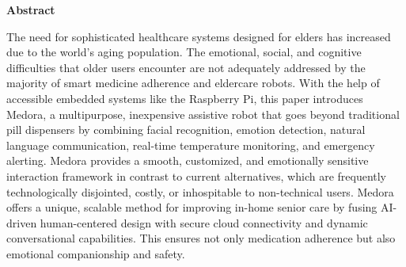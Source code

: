 \clearpage
\begin{center}
    \textbf{\LARGE Abstract}
   
\end{center}
\vspace{1.5cm}
\par
The need for sophisticated healthcare systems designed for elders has increased due to the world's aging population. The emotional, social, and cognitive difficulties that older users encounter are not adequately addressed by the majority of smart medicine adherence and eldercare robots. With the help of accessible embedded systems like the Raspberry Pi, this paper introduces Medora, a multipurpose, inexpensive assistive robot that goes beyond traditional pill dispensers by combining facial recognition, emotion detection, natural language communication, real-time temperature monitoring, and emergency alerting. Medora provides a smooth, customized, and emotionally sensitive interaction framework in contrast to current alternatives, which are frequently technologically disjointed, costly, or inhospitable to non-technical users. Medora offers a unique, scalable method for improving in-home senior care by fusing AI-driven human-centered design with secure cloud connectivity and dynamic conversational capabilities. This ensures not only medication adherence but also emotional companionship and safety.